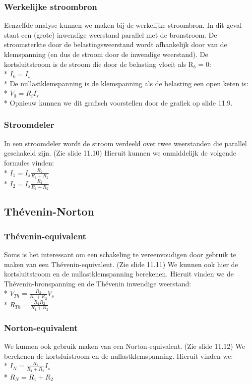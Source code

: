 \documentclass[10pt]{article}
\begin{document}
\subsubsection{Werkelijke stroombron}
Eenzelfde analyse kunnen we maken bij de werkelijke stroombron. In dit geval staat een (grote) inwendige weerstand parallel met de bronstroom. De stroomsterkte door de belastingsweerstand wordt afhankelijk door van de klemspanning (en dus de stroom door de inwendige weerstand). De kortsluitstroom is de stroom die door de belasting vloeit als R$_b$ = 0:\\*
$I_k = I_s$\\*
De nullastklemspanning is de klemspanning als de belasting een open keten is:\\*
$V_0 = R_iI_s$\\*
Opnieuw kunnen we dit grafisch voorstellen door de grafiek op slide 11.9.
\subsubsection{Stroomdeler}
In een stroomdeler wordt de stroom verdeeld over twee weerstanden die parallel geschakeld zijn. (Zie slide 11.10) Hieruit kunnen we onmiddelijk de volgende formules vinden:\\*
$I_1 = I_s\frac{R_2}{R_1+R_2}$\\*
$I_2 = I_s\frac{R_1}{R_1+R_2}$
\subsection{Th\'evenin-Norton}
\subsubsection{Th\'evenin-equivalent}
Soms is het interessant om een schakeling te vereenvoudigen door gebruik te maken van een Th\'evenin-equivalent. (Zie slide 11.11) We kunnen ook hier de kortsluitstroom en de nullastklemspanning berekenen. Hieruit vinden we de Th\'evenin-bronspanning en de Th\'evenin inwendige weerstand:\\*
$V_{Th} = \frac{R_2}{R_1+R_2}V_s$\\*
$R_{Th} = \frac{R_1R_2}{R_1+R_2}$
\subsubsection{Norton-equivalent}
We kunnen ook gebruik maken van een Norton-equivalent. (Zie slide 11.12) We berekenen de kortsluistroom en de nullastklemspanning. Hieruit vinden we:\\*
$I_N = \frac{R_1}{R_1+R_2}I_s$\\*
$R_N = R_1+R_2$
\end{document}
